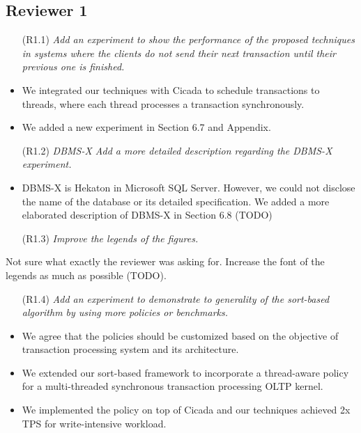 \documentclass{article}
\newcommand{\changed}[1]{#1}
\newcommand{\changed}[1]{{\color{blue}#1}}
\begin{document}
\subsection{Reviewer 1}

\begin{itemize}
\item[(R1.1)] \emph{Add an experiment to show the performance of the proposed techniques in systems where the clients do not send their next transaction until their previous one is finished.}
\end{itemize}
\changed{
	\begin{itemize}
		\item We integrated our techniques with Cicada to schedule transactions to threads, where each thread processes a transaction synchronously.
		\item We added a new experiment in Section 6.7 and Appendix.
	\end{itemize}
}

\begin{itemize}
\item[(R1.2)] \emph{DBMS-X Add a more detailed description regarding the DBMS-X experiment.}
\end{itemize}

\changed{
	\begin{itemize}
	\item DBMS-X is Hekaton in Microsoft SQL Server. However, we could not disclose the name of the database or its detailed specification. We added a more elaborated description of DBMS-X in Section 6.8 (TODO) \end{itemize}
}

\begin{itemize}
\item[(R1.3)] \emph{Improve the legends of the figures.}
\end{itemize}

\changed{
	Not sure what exactly the reviewer was asking for. Increase the font of the legends as much as possible (TODO).
}

\begin{itemize}
\item[(R1.4)] \emph{Add an experiment to demonstrate to generality of the sort-based algorithm by using more policies or benchmarks.}
\end{itemize}

\changed{
	\begin{itemize}
		\item We agree that the policies should be customized based on the objective of transaction processing system and its architecture.
		\item We extended our sort-based framework to incorporate a thread-aware policy for a multi-threaded synchronous transaction processing OLTP kernel.
		\item We implemented the policy on top of Cicada and our techniques achieved 2x TPS for write-intensive workload.
	\end{itemize}
}
\end{document}
